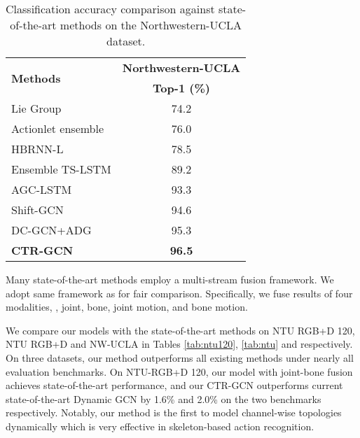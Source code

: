 \documentclass[10pt,twocolumn,letterpaper]{article}
\begin{document}
\begin{table}
	\begin{center}
		\begin{tabular}{l c}
			\hline
			\multirow{2}{*}{\textbf{Methods}} & \textbf{Northwestern-UCLA} \\  &\textbf{Top-1 (\%)}\\
			\hline\hline
			Lie Group\cite{veeriah2015differential}  & 74.2\\
			Actionlet ensemble\cite{wang2013learning} & 76.0\\
			HBRNN-L\cite{du2015hierarchical} & 78.5\\
			Ensemble TS-LSTM\cite{lee2017ensemble} & 89.2\\
			\hline
			AGC-LSTM\cite{si2019attention} & 93.3\\
			Shift-GCN\cite{cheng2020skeleton} & 94.6\\
			DC-GCN+ADG\cite{cheng2020eccv} & 95.3 \\
			\hline\hline
			\textbf{CTR-GCN} & \textbf{96.5}\\
			\hline
		\end{tabular}
	\end{center}
	\vspace{-0.2cm}
	\caption{Classification accuracy comparison against state-of-the-art methods on the Northwestern-UCLA dataset.}
	\label{tab:kinetics}
	\vspace{-0.5cm}
\end{table}

Many state-of-the-art methods employ a multi-stream fusion framework. We adopt same framework as \cite{cheng2020skeleton,ye2020dynamic} for fair comparison. Specifically, we fuse results of four modalities, \ie, joint, bone, joint motion, and bone motion.

We compare our models with the state-of-the-art methods on NTU RGB+D 120, NTU RGB+D and NW-UCLA in Tables \ref{tab:ntu120}, \ref{tab:ntu} and  respectively. On three datasets, our method outperforms all existing methods under nearly all evaluation benchmarks. On NTU-RGB+D 120, our model with joint-bone fusion achieves state-of-the-art performance, and our CTR-GCN outperforms current state-of-the-art Dynamic GCN \cite{ye2020dynamic} by 1.6\% and 2.0\% on the two benchmarks respectively. Notably, our method is the first to model channel-wise topologies dynamically which is very effective in skeleton-based action recognition.
\end{document}
